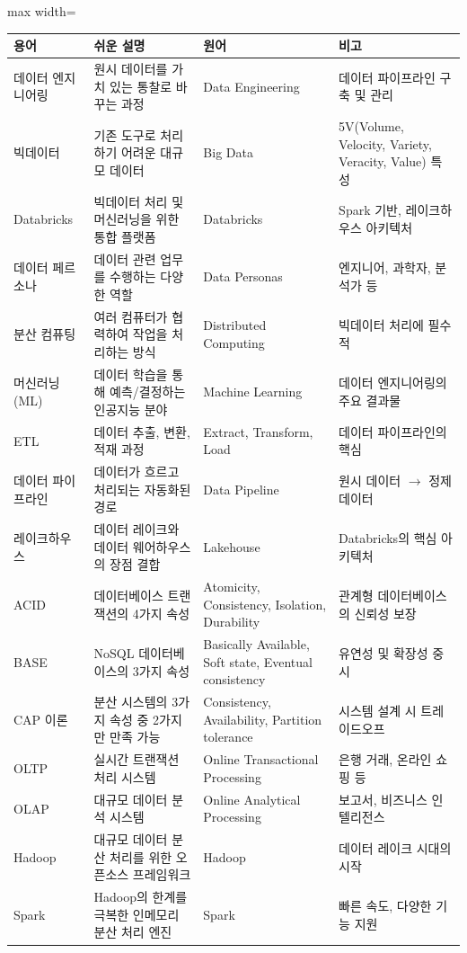 \documentclass[11pt,a4paper]{article}
\theoremstyle{definition}
\begin{document}
\begin{adjustbox}{max width=\textwidth}
\begin{tabular}{llll}
\toprule
\textbf{용어} & \textbf{쉬운 설명} & \textbf{원어} & \textbf{비고} \\
\midrule
데이터 엔지니어링 & 원시 데이터를 가치 있는 통찰로 바꾸는 과정 & Data Engineering & 데이터 파이프라인 구축 및 관리 \\
빅데이터 & 기존 도구로 처리하기 어려운 대규모 데이터 & Big Data & 5V(Volume, Velocity, Variety, Veracity, Value) 특성 \\
Databricks & 빅데이터 처리 및 머신러닝을 위한 통합 플랫폼 & Databricks & Spark 기반, 레이크하우스 아키텍처 \\
데이터 페르소나 & 데이터 관련 업무를 수행하는 다양한 역할 & Data Personas & 엔지니어, 과학자, 분석가 등 \\
분산 컴퓨팅 & 여러 컴퓨터가 협력하여 작업을 처리하는 방식 & Distributed Computing & 빅데이터 처리에 필수적 \\
머신러닝 (ML) & 데이터 학습을 통해 예측/결정하는 인공지능 분야 & Machine Learning & 데이터 엔지니어링의 주요 결과물 \\
ETL & 데이터 추출, 변환, 적재 과정 & Extract, Transform, Load & 데이터 파이프라인의 핵심 \\
데이터 파이프라인 & 데이터가 흐르고 처리되는 자동화된 경로 & Data Pipeline & 원시 데이터 $\rightarrow$ 정제 데이터 \\
레이크하우스 & 데이터 레이크와 데이터 웨어하우스의 장점 결합 & Lakehouse & Databricks의 핵심 아키텍처 \\
ACID & 데이터베이스 트랜잭션의 4가지 속성 & Atomicity, Consistency, Isolation, Durability & 관계형 데이터베이스의 신뢰성 보장 \\
BASE & NoSQL 데이터베이스의 3가지 속성 & Basically Available, Soft state, Eventual consistency & 유연성 및 확장성 중시 \\
CAP 이론 & 분산 시스템의 3가지 속성 중 2가지만 만족 가능 & Consistency, Availability, Partition tolerance & 시스템 설계 시 트레이드오프 \\
OLTP & 실시간 트랜잭션 처리 시스템 & Online Transactional Processing & 은행 거래, 온라인 쇼핑 등 \\
OLAP & 대규모 데이터 분석 시스템 & Online Analytical Processing & 보고서, 비즈니스 인텔리전스 \\
Hadoop & 대규모 데이터 분산 처리를 위한 오픈소스 프레임워크 & Hadoop & 데이터 레이크 시대의 시작 \\
Spark & Hadoop의 한계를 극복한 인메모리 분산 처리 엔진 & Spark & 빠른 속도, 다양한 기능 지원 \\

\end{tabular}
\end{adjustbox}
\end{document}
